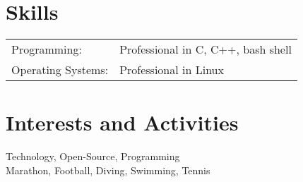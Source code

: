 \documentclass[a4paper,10pt]{article}
\begin{document}
\section{Skills}
\begin{tabular}{ll}
Programming:& Professional in C, C++, bash shell \\%
Operating Systems: & Professional in Linux %
\end{tabular}





\section{Interests and Activities}
Technology, Open-Source, Programming\\
Marathon, Football, Diving, Swimming, Tennis

\end{document}
